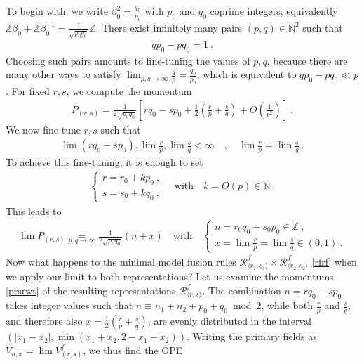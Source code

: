 \documentclass[12pt, a4paper]{article}
\begin{document}
To begin with, we write $\beta_0^2 = \frac{q_0}{p_0}$ with $p_0$ and $q_0$ coprime integers, equivalently $\mathbb{Z}\beta_0+\mathbb{Z}\beta_0^{-1}=\frac{1}{\sqrt{p_0q_0}}\mathbb{Z}$. There exist infinitely many pairs $(p,q)\in \mathbb{N}^2$ such that 
\begin{align}
 qp_0-pq_0 = 1 \ .
\end{align}
Choosing such pairs amounts to fine-tuning the values of $p, q$, because there are many other ways to satisfy $\lim_{p,q\to\infty}\frac{q}{p}= \frac{q_0}{p_0}$, which is equivalent to $qp_0-pq_0 \ll p$. For fixed $r,s$, we compute the momentum
\begin{align}
 P_{(r,s)} = \frac{1}{2\sqrt{p_0q_0}}\left[rq_0-sp_0+ \frac12\left(\frac{r}{p}+\frac{s}{q}\right) + O\left(\frac{1}{p^2}\right)\right]\ . 
 \label{prsrwt}
\end{align}
We now fine-tune $r,s$ such that 
\begin{align}
 \lim(rq_0-sp_0), \lim\frac{r}{p} , \lim\frac{s}{q} <\infty \quad , \quad \lim\frac{r}{p} = \lim\frac{s}{q} \ . 
\end{align}
To achieve this fine-tuning, it is enough to set
\begin{align}
 \left\{\begin{array}{l} r = r_0 + k p_0\ , \\ s = s_0 + k q_0\ , \end{array}\right. \quad  \text{with} \quad k = O(p)\in \mathbb{N}\ .
\end{align}
This leads to 
\begin{align}
 \lim P_{(r,s)} \underset{p,q\to\infty}{=}  \frac{1}{2\sqrt{p_0q_0}}\left(n+x\right)\quad \text{with} \quad \left\{\begin{array}{l} n =r_0q_0 - s_0p_0 \in \mathbb{Z} \ , \\ x =  \lim\frac{r}{p} = \lim\frac{s}{q} \in (0, 1) \ . \end{array}\right.
\end{align}
Now what happens to the minimal model fusion rules $\mathcal{R}^f_{\langle r_1,s_1\rangle} \times \mathcal{R}^f_{\langle r_2,s_2\rangle}$ \eqref{rfrf} when we apply our limit to both representations? Let us examine the momentums \eqref{prsrwt} of the resulting representations $\mathcal{R}^f_{\langle r,s\rangle}$. The combination $n=rq_0-sp_0$ takes integer values such that $n\equiv n_1+n_2+p_0+q_0\bmod 2$, while 
both $\frac{r}{p}$ and $\frac{s}{q}$, and therefore also $x=\frac12\left(\frac{r}{p}+\frac{s}{q}\right)$, are evenly distributed in the interval $(|x_1-x_2|, \min(x_1+x_2,2-x_1-x_2))$. Writing the primary fields as $V_{n,x} = \lim V_{(r,s)}^f$, we thus find the OPE
\end{document}
